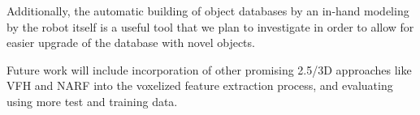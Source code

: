 \documentclass[a4paper, 10 pt, conference]{sty/ieeeconf}
\begin{document}
Additionally, the automatic building of object databases by an in-hand modeling by the
robot itself is a useful tool that we plan to investigate in order to allow for
easier upgrade of the database with novel objects.

Future work will include incorporation of other promising 2.5/3D approaches like VFH and NARF
into the voxelized feature extraction process, and evaluating using more test and training data.




%

\end{document}
